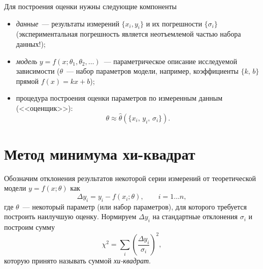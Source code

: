 %

Для построения оценки нужны следующие компоненты
\begin{itemize}
    \item \emph{данные}~--- результаты измерений $\{x_i, y_i\}$
    и их погрешности $\{\sigma_i\}$
    (экспериментальная погрешность является неотъемлемой
    частью набора данных!);
    \item \emph{модель} $y=f(x; {\theta_1,\theta_2,\ldots })$~---
параметрическое описание исследуемой зависимости
($\theta$~--- набор параметров модели, например,
коэффициенты $\{k,\,b\}$ прямой $f(x)=kx+b$);
\item процедура построения оценки параметров по
измеренным данным (<<оценщик>>):
\[
\theta \approx \hat{\theta}(\{x_i,\,y_i,\,\sigma_i\}).
\]
\end{itemize}


\section{Метод минимума хи-квадрат}
\label{sec:chi2}

Обозначим отклонения результатов некоторой серии измерений от теоретической
модели $y=f(x; \theta)$ как
\[
 \Delta y_i = y_i- f(x_i; \theta),\qquad i= 1\ldots n,
\]
где $\theta$~--- некоторый параметр (или набор параметров),
для которого требуется построить наилучшую оценку. Нормируем $\Delta y_i$
на стандартные отклонения $\sigma_i$ и построим сумму
\begin{equation}
    \chi^2 = \sum_i{\left(\frac{\Delta y_i}{\sigma_i}\right)^2},
    \label{eq:chi2}
\end{equation}
которую принято называть суммой \emph{хи-квадрат}.


